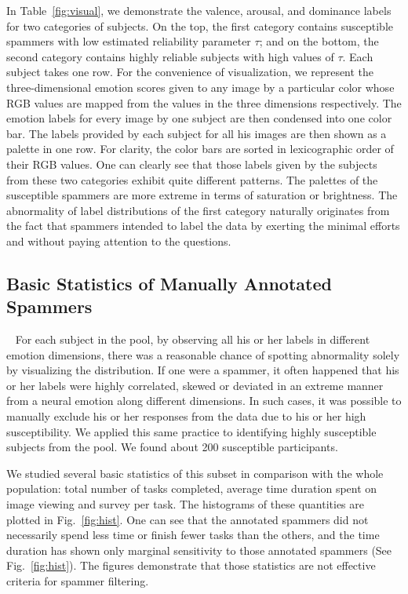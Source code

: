 \documentclass[10pt,journal,letterpaper,compsoc,twoside]{IEEEtran}
\begin{document}
In Table~\ref{fig:visual}, we demonstrate the valence, arousal, and dominance labels for two categories of subjects.
On the top, the first category contains susceptible spammers with low estimated reliability parameter $\tau$; and on the bottom, the second category contains highly reliable subjects with high values of $\tau$. Each subject takes one row. For the convenience of visualization, we represent the three-dimensional emotion scores given to any image by a particular color whose RGB values are mapped from the values in the three dimensions respectively.  The emotion labels for every image by one subject are then condensed into one color bar. The labels provided by each subject for all his images are then shown as a palette in one row. For clarity, the color bars are sorted in lexicographic order of their RGB values.
One can clearly see that those labels given by the subjects from these two categories exhibit quite different patterns. The palettes of the susceptible spammers are more extreme in terms of saturation or brightness. 
The abnormality of label distributions of the first category naturally
originates from the fact that spammers intended to label the data
by {exerting the minimal efforts and without paying attention} to the questions. 


\subsection{Basic Statistics of Manually Annotated Spammers}~\label{sec:spammer}
{For each subject in the pool, by observing all his or her labels in different
emotion dimensions, there was a reasonable chance of spotting abnormality 
solely by visualizing the distribution. If one were a spammer, it often happened that his or her
labels {were highly correlated, skewed or 
deviated in an extreme manner from a neural emotion along different dimensions}. In such cases, it was possible to manually
exclude his or her responses from the data due to his or her high susceptibility.
We applied this same practice to identifying highly susceptible subjects from
the pool. We found about 200 susceptible participants. }

{We studied several basic statistics of this subset in comparison with the whole population:
total number of tasks completed, average time duration spent on image viewing and survey per task. The histograms of these quantities are 
plotted in Fig.~\ref{fig:hist}. One can see that the annotated spammers did not necessarily spend less time or 
finish fewer tasks than the others, and the time duration has shown only marginal sensitivity to those annotated spammers (See Fig.~\ref{fig:hist}). The figures demonstrate that those statistics are not effective criteria for spammer filtering.}
\end{document}
